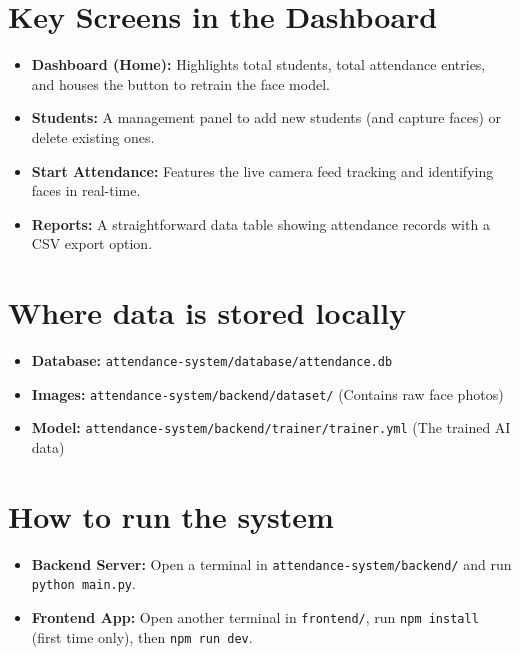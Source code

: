 \documentclass[12pt]{article}
\begin{document}
\section*{Key Screens in the Dashboard}
\begin{itemize}[leftmargin=*]
  \item \textbf{Dashboard (Home):} Highlights total students, total attendance entries, and houses the button to retrain the face model.
  \item \textbf{Students:} A management panel to add new students (and capture faces) or delete existing ones.
  \item \textbf{Start Attendance:} Features the live camera feed tracking and identifying faces in real-time.
  \item \textbf{Reports:} A straightforward data table showing attendance records with a CSV export option.
\end{itemize}

\section*{Where data is stored locally}
\begin{itemize}[leftmargin=*]
  \item \textbf{Database:} \texttt{attendance-system/database/attendance.db}
  \item \textbf{Images:} \texttt{attendance-system/backend/dataset/} (Contains raw face photos)
  \item \textbf{Model:} \texttt{attendance-system/backend/trainer/trainer.yml} (The trained AI data)
\end{itemize}

\section*{How to run the system}
\begin{itemize}[leftmargin=*]
  \item \textbf{Backend Server:} Open a terminal in \texttt{attendance-system/backend/} and run \texttt{python main.py}.
  \item \textbf{Frontend App:} Open another terminal in \texttt{frontend/}, run \texttt{npm install} (first time only), then \texttt{npm run dev}.
\end{itemize}
\end{document}
